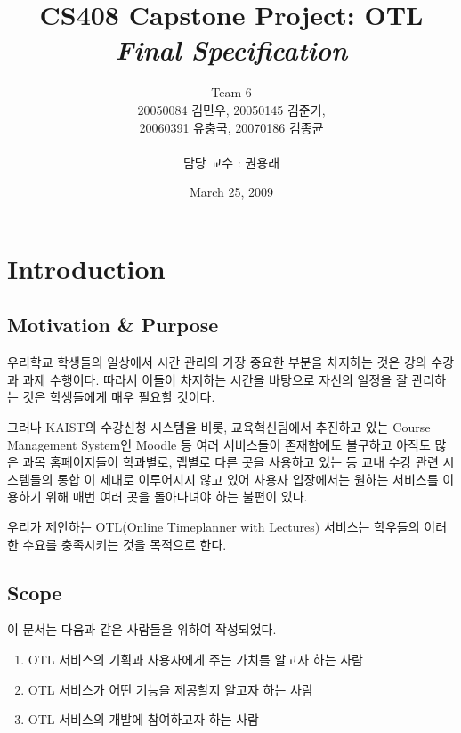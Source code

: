 \documentclass[a4paper,titlepage]{article}
\title{\textbf{CS408 Capstone Project: OTL}\\ \textit{Final Specification}}
\author{Team 6\\20050084 김민우, 20050145 김준기,\\20060391 유충국, 20070186 김종균\\\\담당 교수 : 권용래}
\begin{document}
\date{March 25, 2009}
\maketitle

\tableofcontents
\listoffigures

\pagebreak

\section{Introduction}
\subsection{Motivation \& Purpose}
우리학교 학생들의 일상에서 시간 관리의 가장 중요한 부분을 차지하는 것은 강의 수강과 과제 수행이다.
따라서 이들이 차지하는 시간을 바탕으로 자신의 일정을 잘 관리하는 것은 학생들에게 매우 필요할 것이다. 

그러나 KAIST의 수강신청 시스템을 비롯, 교육혁신팀에서 추진하고 있는 Course Management System인 Moodle 등 여러 서비스들이 존재함에도 불구하고 아직도 많은 과목 
홈페이지들이 학과별로, 랩별로 다른 곳을 사용하고 있는 등 교내 수강 관련 시스템들의 통합 이 제대로 이루어지지 않고 있어 사용자 입장에서는 원하는 서비스를 이용하기 위해 매번 여러 곳을 돌아다녀야 하는 불편이 있다. 

우리가 제안하는 OTL(Online Timeplanner with Lectures) 서비스는 학우들의 이러한 수요를 충족시키는 것을 목적으로 한다.

\subsection{Scope}
이 문서는 다음과 같은 사람들을 위하여 작성되었다.
\begin{enumerate}
	\item OTL 서비스의 기획과 사용자에게 주는 가치를 알고자 하는 사람
	\item OTL 서비스가 어떤 기능을 제공할지 알고자 하는 사람
	\item OTL 서비스의 개발에 참여하고자 하는 사람
\end{enumerate}
\end{document}
